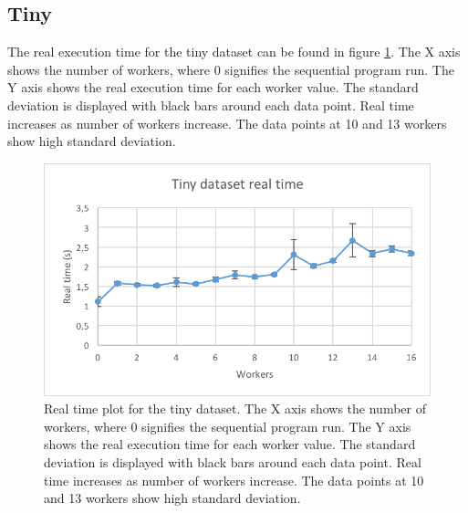 \subsection{Tiny}
The real execution time for the tiny dataset can be found in figure \ref{fig:dataset_1_real_time}.
The X axis shows the number of workers, where 0 signifies the sequential program run.
The Y axis shows the real execution time for each worker value. The standard deviation is displayed with black bars around each data point. Real time
increases as number of workers increase. The data points at 10 and 13 workers show high standard deviation.
\begin{figure}[ht]
  \centering
  \includegraphics[width=120mm]{figures/dataset_1/dataset_1_real_time.png}
  \caption[Real time plot for the tiny dataset.]{Real time plot for the tiny dataset. The X axis shows the number of workers, where 0 signifies the sequential program run.
  The Y axis shows the real execution time for each worker value. The standard deviation is displayed with black bars around each data point. Real time
  increases as number of workers increase. The data points at 10 and 13 workers show high standard deviation.}
  \label{fig:dataset_1_real_time}
\end{figure}

